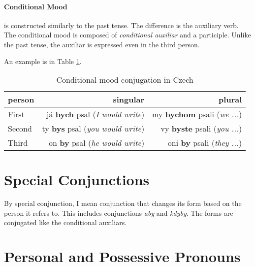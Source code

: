 \paragraph{Conditional Mood} is constructed similarly to the past tense. The difference is the auxiliary verb. The conditional mood is composed of \emph{conditional auxiliar} and a participle. Unlike the past tense, the auxiliar is expressed even in the third person.

An example is in Table \ref{tab:cond}.

\begin{table}[!ht]
	\caption{Conditional mood conjugation in Czech}
	\label{tab:cond}
	\begin{center}
		\begin{tabular}{l|r|r}
			person & singular & plural \\
			\hline
			First & já \textbf{bych} psal (\emph{I would write}) & my \textbf{bychom} psali (\emph{we ...}) \\
			Second & ty \textbf{bys} psal (\emph{you would write}) & vy \textbf{byste} psali (\emph{you ...})  \\
			Third & on \textbf{by} psal (\emph{he would write}) & oni \textbf{by} psali (\emph{they ...})  \\
		\end{tabular}
	\end{center}
\end{table}

\section{Special Conjunctions}

By special conjunction, I mean conjunction that changes its form based on the person it refers to. This includes conjunctions \emph{aby} and \emph{kdyby}. The forms are conjugated like the conditional auxiliars.

\section{Personal and Possessive Pronouns}
